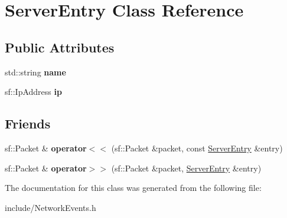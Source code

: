 \hypertarget{class_server_entry}{\section{Server\-Entry Class Reference}
\label{class_server_entry}
}
\subsection*{Public Attributes}
\begin{DoxyCompactItemize}
\item 
\hypertarget{class_server_entry_a2f86249f9ad7b83600b7820f35955ac3}{std\-::string {\bfseries name}}\label{class_server_entry_a2f86249f9ad7b83600b7820f35955ac3}

\item 
\hypertarget{class_server_entry_ace090ceebcb355b23239797ad881b6b9}{sf\-::\-Ip\-Address {\bfseries ip}}\label{class_server_entry_ace090ceebcb355b23239797ad881b6b9}

\end{DoxyCompactItemize}
\subsection*{Friends}
\begin{DoxyCompactItemize}
\item 
\hypertarget{class_server_entry_abbdb757ca7b36097cbfee856d9b0d9fa}{sf\-::\-Packet \& {\bfseries operator$<$$<$} (sf\-::\-Packet \&packet, const \hyperlink{class_server_entry}{Server\-Entry} \&entry)}\label{class_server_entry_abbdb757ca7b36097cbfee856d9b0d9fa}

\item 
\hypertarget{class_server_entry_a24cfd6a036c4bab77e58bcc375b664d1}{sf\-::\-Packet \& {\bfseries operator$>$$>$} (sf\-::\-Packet \&packet, \hyperlink{class_server_entry}{Server\-Entry} \&entry)}\label{class_server_entry_a24cfd6a036c4bab77e58bcc375b664d1}

\end{DoxyCompactItemize}


The documentation for this class was generated from the following file\-:\begin{DoxyCompactItemize}
\item 
include/Network\-Events.\-h\end{DoxyCompactItemize}
